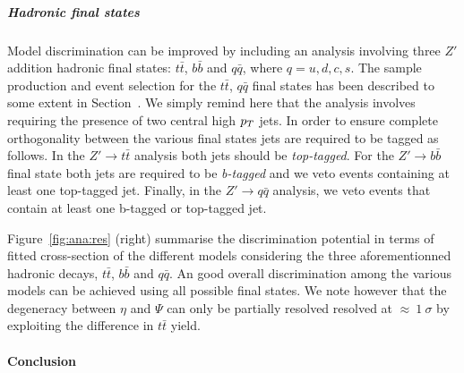 \subparagraph*{Hadronic final states}
\label{par:hadana}

Model discrimination can be improved by including an analysis involving three $Z'$ addition hadronic final states: $t\bar{t}$, $b\bar{b}$ and $q\bar{q}$, where $q=u,d,c,s$. The sample production and event selection for the $t\bar{t}$, $q\bar{q}$ final states has been described to some extent in Section~\cite{subsubsec:hr_had}. We simply remind here that the analysis involves requiring the presence of two central high $p_{T}$ jets. In order to ensure complete orthogonality between the various final states jets are required to be tagged as follows. In the $Z' \rightarrow t\bar{t}$ analysis both jets should be \emph{top-tagged}. For the $Z' \rightarrow b\bar{b}$ final state both jets are required to be \emph{b-tagged} and we veto events containing at least one top-tagged jet. Finally, in the $Z' \rightarrow q\bar{q}$ analysis, we veto events that contain at least one b-tagged or top-tagged jet.

Figure~\ref{fig:ana:res} (right) summarise the discrimination potential in terms of fitted cross-section of the different models considering the three aforementionned hadronic decays, $t\bar{t}$,  $b\bar{b}$ and $q\bar{q}$. An good overall discrimination among the various models can be achieved using all possible final states. We note however that the degeneracy between $\eta$ and $\Psi$ can only be partially resolved resolved at $\approx~1~\sigma$ by exploiting the difference in $t\bar{t}$ yield.

\paragraph*{Conclusion}
